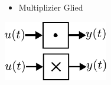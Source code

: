 \begin{figure}[h]
\begin{subfigure}[c]{\textwidth}
\begin{minipage}{0.5\textwidth}
		\end{minipage}
	\end{subfigure}
	\vspace{1cm}
	\begin{subfigure}[c]{\textwidth}
		\begin{minipage}{0.5\textwidth}
			\begin{itemize}
				\item Multiplizier Glied
			\end{itemize}
		\end{minipage}\hfill
		\begin{minipage}{0.5\textwidth}
			\centering
			\includegraphics[width=0.5\textwidth]{Abbildungen/Modellbildung/PDF/Multiplizierer.pdf}
		\end{minipage}
	\end{subfigure}
\end{figure}
%
\newpage
%
